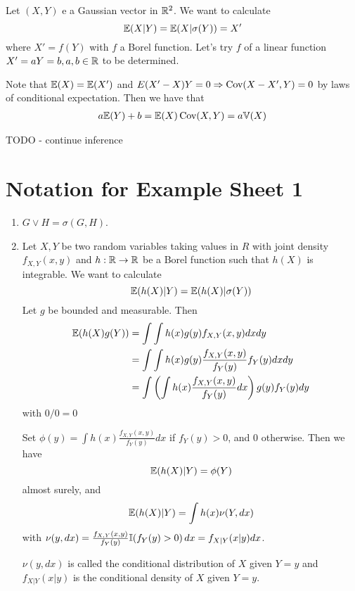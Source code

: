 \begin{exmp}
  \label{defn:inequalities:7}
  Let $(X, Y)$ e a Gaussian vector in $\mathbb{R}^{2}$.  We want to calculate
  \begin{equation}
    \label{eq:21}
    \E{X | Y} = \E{X | \sigma(Y) } = X'
  \end{equation} where $X' = f(Y)$ with $f$ a Borel function.  Let's
  try $f$ of a linear function $X' = aY = b, a, b \in \mathbb{R}$ to be
  determined.

  Note that $\E{X} = \E{X'}$ and $E{(X' - X) Y} = 0 \Rightarrow
  \Cov{X-X'}{Y} = 0$ by laws of
  conditional expectation.  Then we have that
  \begin{align}
    \label{eq:22}
    a\E{Y} + b = \E{X}
    \Cov{X}{Y} = a \Var{X}
  \end{align}

  TODO - continue inference
\end{exmp}

\section{Notation for Example Sheet 1}
\label{sec:notat-example-sheet}

\begin{enumerate}
\item $G \vee H = \sigma(G, H)$.
\item Let $X, Y$ be two random variables taking values in $R$ with
  joint density $f_{X, Y}(x, y)$ and $h: \mathbb{R} \rightarrow \mathbb{R}$ be a Borel
  function such that $h(X)$ is integrable.  We want to calculate
  \begin{equation}
    \label{eq:13}
    \E{h(X)|Y} = \E{h(X)|\sigma(Y)}
  \end{equation} Let $g$ be bounded and measurable.  Then
  \begin{align}
    \E{h(X) g(Y)} &= \int \int h(x) g(y) f_{X, Y}(x, y) dx dy \\
    &= \int \int h(x) g(y) \frac{f_{X, Y}(x, y)}{f_{Y}(y)} f_{Y}(y) dx
    dy \\
    &= \int \left( \int h(x) \frac{f_{X, Y}(x, y)}{f_{Y}(y)} dx
    \right) g(y) f_{Y}(y) dy
  \end{align} with $0/0 = 0$

  Set $\phi(y) =  \int h(x) \frac{f_{X, Y}(x, y)}{f_{Y}(y)} dx$ if
  $f_{Y}(y) > 0$, and 0 otherwise.  Then we have
  \begin{equation}
    \label{eq:16}
    \E{h(X) | Y} = \phi(Y)
  \end{equation} almost surely, and
  \begin{equation}
    \label{eq:23}
    \E{h(X) | Y} = \int h(x) \nu(Y, dx)
  \end{equation} with $\nu(y, dx) = \frac{f_{X, Y}(x,
    y)}{f_{Y}(y)}\I{f_{Y}(y) > 0} dx = f_{X|Y}(x|y) dx$.

  $\nu(y, dx)$ is called the conditional distribution of $X$ given $Y
  = y$ and $f_{X|Y}(x|y)$ is the conditional density of $X$ given $Y=y$.
\end{enumerate}

